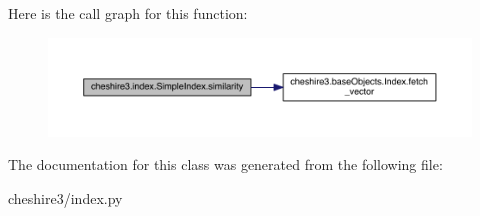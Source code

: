 Here is the call graph for this function\-:
\nopagebreak
\begin{figure}[H]
\begin{center}
\leavevmode
\includegraphics[width=350pt]{classcheshire3_1_1index_1_1_simple_index_a0af628a60284c679e17ea3ed92d24bf8_cgraph}
\end{center}
\end{figure}




The documentation for this class was generated from the following file\-:\begin{DoxyCompactItemize}
\item 
cheshire3/index.\-py\end{DoxyCompactItemize}
